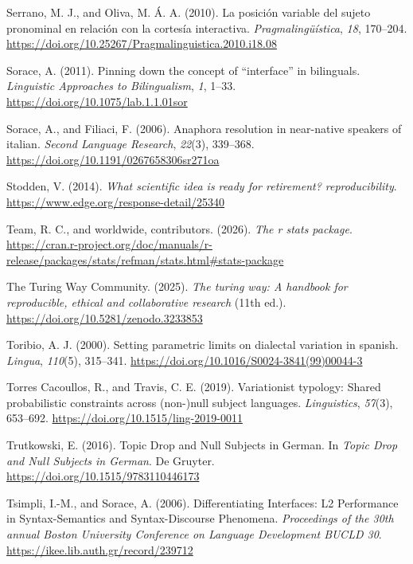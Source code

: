 \documentclass[
  letterpaper,
  DIV=11,
  numbers=noendperiod]{scrartcl}
\newlength{\cslhangindent}
\newenvironment{CSLReferences}[2] %
 {\begin{list}{}{%
  \setlength{\itemindent}{0pt}
  \setlength{\leftmargin}{0pt}
  \setlength{\parsep}{0pt}
  \ifodd #1
   \setlength{\leftmargin}{\cslhangindent}
   \setlength{\itemindent}{-1\cslhangindent}
  \fi
  \setlength{\itemsep}{#2\baselineskip}}}
 {\end{list}}
\begin{document}
\begin{CSLReferences}{1}{0}
Serrano, M. J., and Oliva, M. Á. A. (2010). La posición variable del
sujeto pronominal en relación con la cortesía interactiva.
\emph{Pragmalingüística}, \emph{18}, 170--204.
\url{https://doi.org/10.25267/Pragmalinguistica.2010.i18.08}

Sorace, A. (2011). Pinning down the concept of {``interface''} in
bilinguals. \emph{Linguistic Approaches to Bilingualism}, \emph{1},
1--33. \url{https://doi.org/10.1075/lab.1.1.01sor}

Sorace, A., and Filiaci, F. (2006). Anaphora resolution in near-native
speakers of italian. \emph{Second Language Research}, \emph{22}(3),
339--368. \url{https://doi.org/10.1191/0267658306sr271oa}

Stodden, V. (2014). \emph{What scientific idea is ready for retirement?
reproducibility}. \url{https://www.edge.org/response-detail/25340}

{Team, R. C., and worldwide, contributors}. (2026). \emph{The r stats
package}.
\url{https://cran.r-project.org/doc/manuals/r-release/packages/stats/refman/stats.html\#stats-package}

The Turing Way Community. (2025). \emph{The turing way: A handbook for
reproducible, ethical and collaborative research} (11th ed.).
\url{https://doi.org/10.5281/zenodo.3233853}

Toribio, A. J. (2000). Setting parametric limits on dialectal variation
in spanish. \emph{Lingua}, \emph{110}(5), 315--341.
\url{https://doi.org/10.1016/S0024-3841(99)00044-3}

Torres Cacoullos, R., and Travis, C. E. (2019). Variationist typology:
{Shared} probabilistic constraints across (non-)null subject languages.
\emph{Linguistics}, \emph{57}(3), 653--692.
\url{https://doi.org/10.1515/ling-2019-0011}

Trutkowski, E. (2016). Topic {Drop} and {Null} {Subjects} in {German}.
In \emph{Topic {Drop} and {Null} {Subjects} in {German}}. De Gruyter.
\url{https://doi.org/10.1515/9783110446173}

Tsimpli, I.-M., and Sorace, A. (2006). Differentiating Interfaces: L2
Performance in Syntax-Semantics and Syntax-Discourse Phenomena.
\emph{Proceedings of the 30th annual
{\textbraceleft}Boston{\textbraceright}
{\textbraceleft}University{\textbraceright}
{\textbraceleft}Conference{\textbraceright} on
{\textbraceleft}Language{\textbraceright} {\textbraceleft}Development
{\textbraceleft}BUCLD{\textbraceright} 30}.
\url{https://ikee.lib.auth.gr/record/239712}


\end{CSLReferences}
\end{document}
